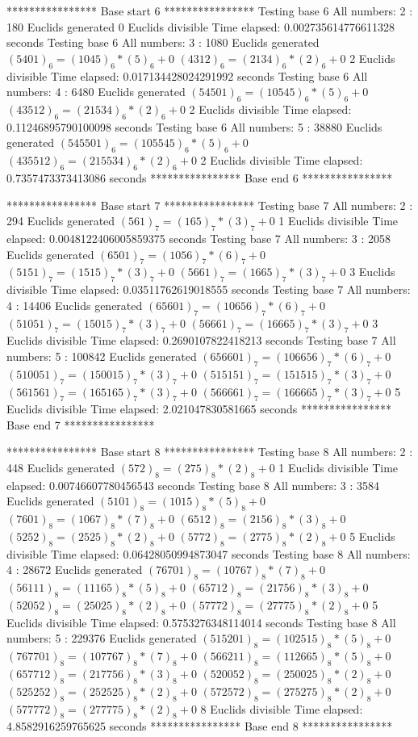 **************** Base start 6 ****************
Testing base 6 All numbers: 2 :
	 180 Euclids generated
	 0 Euclids divisible
Time elapsed: 0.002735614776611328 seconds
Testing base 6 All numbers: 3 :
	 1080 Euclids generated
	$(5401)_{6}=(1045)_{6}*(5)_{6}+0$
	$(4312)_{6}=(2134)_{6}*(2)_{6}+0$
	 2 Euclids divisible
Time elapsed: 0.017134428024291992 seconds
Testing base 6 All numbers: 4 :
	 6480 Euclids generated
	$(54501)_{6}=(10545)_{6}*(5)_{6}+0$
	$(43512)_{6}=(21534)_{6}*(2)_{6}+0$
	 2 Euclids divisible
Time elapsed: 0.11246895790100098 seconds
Testing base 6 All numbers: 5 :
	 38880 Euclids generated
	$(545501)_{6}=(105545)_{6}*(5)_{6}+0$
	$(435512)_{6}=(215534)_{6}*(2)_{6}+0$
	 2 Euclids divisible
Time elapsed: 0.7357473373413086 seconds
**************** Base end 6 ****************

**************** Base start 7 ****************
Testing base 7 All numbers: 2 :
	 294 Euclids generated
	$(561)_{7}=(165)_{7}*(3)_{7}+0$
	 1 Euclids divisible
Time elapsed: 0.0048122406005859375 seconds
Testing base 7 All numbers: 3 :
	 2058 Euclids generated
	$(6501)_{7}=(1056)_{7}*(6)_{7}+0$
	$(5151)_{7}=(1515)_{7}*(3)_{7}+0$
	$(5661)_{7}=(1665)_{7}*(3)_{7}+0$
	 3 Euclids divisible
Time elapsed: 0.03511762619018555 seconds
Testing base 7 All numbers: 4 :
	 14406 Euclids generated
	$(65601)_{7}=(10656)_{7}*(6)_{7}+0$
	$(51051)_{7}=(15015)_{7}*(3)_{7}+0$
	$(56661)_{7}=(16665)_{7}*(3)_{7}+0$
	 3 Euclids divisible
Time elapsed: 0.2690107822418213 seconds
Testing base 7 All numbers: 5 :
	 100842 Euclids generated
	$(656601)_{7}=(106656)_{7}*(6)_{7}+0$
	$(510051)_{7}=(150015)_{7}*(3)_{7}+0$
	$(515151)_{7}=(151515)_{7}*(3)_{7}+0$
	$(561561)_{7}=(165165)_{7}*(3)_{7}+0$
	$(566661)_{7}=(166665)_{7}*(3)_{7}+0$
	 5 Euclids divisible
Time elapsed: 2.021047830581665 seconds
**************** Base end 7 ****************

**************** Base start 8 ****************
Testing base 8 All numbers: 2 :
	 448 Euclids generated
	$(572)_{8}=(275)_{8}*(2)_{8}+0$
	 1 Euclids divisible
Time elapsed: 0.00746607780456543 seconds
Testing base 8 All numbers: 3 :
	 3584 Euclids generated
	$(5101)_{8}=(1015)_{8}*(5)_{8}+0$
	$(7601)_{8}=(1067)_{8}*(7)_{8}+0$
	$(6512)_{8}=(2156)_{8}*(3)_{8}+0$
	$(5252)_{8}=(2525)_{8}*(2)_{8}+0$
	$(5772)_{8}=(2775)_{8}*(2)_{8}+0$
	 5 Euclids divisible
Time elapsed: 0.06428050994873047 seconds
Testing base 8 All numbers: 4 :
	 28672 Euclids generated
	$(76701)_{8}=(10767)_{8}*(7)_{8}+0$
	$(56111)_{8}=(11165)_{8}*(5)_{8}+0$
	$(65712)_{8}=(21756)_{8}*(3)_{8}+0$
	$(52052)_{8}=(25025)_{8}*(2)_{8}+0$
	$(57772)_{8}=(27775)_{8}*(2)_{8}+0$
	 5 Euclids divisible
Time elapsed: 0.5753276348114014 seconds
Testing base 8 All numbers: 5 :
	 229376 Euclids generated
	$(515201)_{8}=(102515)_{8}*(5)_{8}+0$
	$(767701)_{8}=(107767)_{8}*(7)_{8}+0$
	$(566211)_{8}=(112665)_{8}*(5)_{8}+0$
	$(657712)_{8}=(217756)_{8}*(3)_{8}+0$
	$(520052)_{8}=(250025)_{8}*(2)_{8}+0$
	$(525252)_{8}=(252525)_{8}*(2)_{8}+0$
	$(572572)_{8}=(275275)_{8}*(2)_{8}+0$
	$(577772)_{8}=(277775)_{8}*(2)_{8}+0$
	 8 Euclids divisible
Time elapsed: 4.8582916259765625 seconds
**************** Base end 8 ****************

